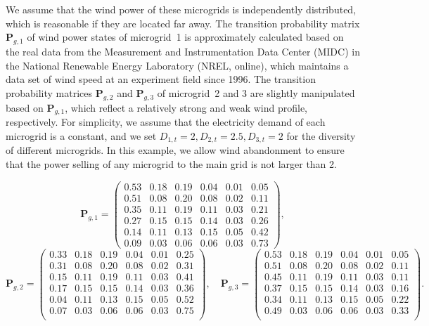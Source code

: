 \documentclass[12pt]{article}
\begin{document}

We assume that the wind power of these microgrids is independently
distributed, which is reasonable if they are located far away. The
transition probability matrix $\bm P_{g,1}$ of wind power states of
microgrid~1 is approximately calculated based on the real data from
the Measurement and Instrumentation Data Center (MIDC) in the
National Renewable Energy Laboratory (NREL, online), which maintains
a data set of wind speed at an experiment field since 1996. The
transition probability matrices $\bm P_{g,2}$ and $\bm P_{g,3}$ of
microgrid~2 and 3 are slightly manipulated based on $\bm P_{g,1}$,
which reflect a relatively strong and weak wind profile,
respectively. For simplicity, we assume that the electricity demand
of each microgrid is a constant, and we set $D_{1,t} = 2, D_{2,t} =
2.5, D_{3,t} = 2$ for the diversity of different microgrids. In this
example, we allow wind abandonment to ensure that the power selling
of any microgrid to the main grid is not larger than 2.

\begin{equation*}
\bm{P}_{g,1}= \left(
\begin{matrix}
0.53 & 0.18 & 0.19 & 0.04 & 0.01 & 0.05\\
0.51 & 0.08 & 0.20 & 0.08 & 0.02 & 0.11\\
0.35 & 0.11 & 0.19 & 0.11 & 0.03 & 0.21\\
0.27 & 0.15 & 0.15 & 0.14 & 0.03 & 0.26\\
0.14 & 0.11 & 0.13 & 0.15 & 0.05 & 0.42\\
0.09 & 0.03 & 0.06 & 0.06 & 0.03 & 0.73
\end{matrix}
\right),
\end{equation*}
\begin{equation*}\bm{P}_{g,2}= \left(
\begin{matrix}
0.33 & 0.18 & 0.19 & 0.04 & 0.01 & 0.25\\
0.31 & 0.08 & 0.20 & 0.08 & 0.02 & 0.31\\
0.15 & 0.11 & 0.19 & 0.11 & 0.03 & 0.41\\
0.17 & 0.15 & 0.15 & 0.14 & 0.03 & 0.36\\
0.04 & 0.11 & 0.13 & 0.15 & 0.05 & 0.52\\
0.07 & 0.03 & 0.06 & 0.06 & 0.03 & 0.75\\
\end{matrix}
\right), \quad \bm{P}_{g,3}= \left(
\begin{matrix}
0.53 & 0.18 & 0.19 & 0.04 & 0.01 & 0.05\\
0.51 & 0.08 & 0.20 & 0.08 & 0.02 & 0.11\\
0.45 & 0.11 & 0.19 & 0.11 & 0.03 & 0.11\\
0.37 & 0.15 & 0.15 & 0.14 & 0.03 & 0.16\\
0.34 & 0.11 & 0.13 & 0.15 & 0.05 & 0.22\\
0.49 & 0.03 & 0.06 & 0.06 & 0.03 & 0.33\\
\end{matrix}
\right).
\end{equation*}
\end{document}
